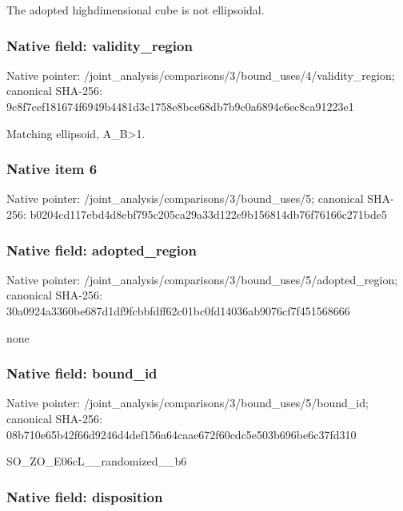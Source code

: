 \documentclass[10pt,a4paper]{article}
\begin{document}
The adopted highdimensional cube is not ellipsoidal.


\subsubsection{Native field: validity\_region}


Native pointer: /joint\_analysis/comparis\allowbreak{}ons/3/bound\_uses/4/valid\allowbreak{}ity\_region; canonical SHA-256: 9c8f7cef181674f6949b4481\allowbreak{}d3c1758e8bce68db7b9c0a68\allowbreak{}94c6ec8ca91223e1


Matching ellipsoid, A\_B>1.


\subsubsection{Native item 6}


Native pointer: /joint\_analysis/comparis\allowbreak{}ons/3/bound\_uses/5; canonical SHA-256: b0204cd117ebd4d8ebf795c2\allowbreak{}05ca29a33d122e9b156814db\allowbreak{}76f76166c271bde5



\subsubsection{Native field: adopted\_region}


Native pointer: /joint\_analysis/comparis\allowbreak{}ons/3/bound\_uses/5/adopt\allowbreak{}ed\_region; canonical SHA-256: 30a0924a3360be687d1df9fc\allowbreak{}bbfdff62c01bc0fd14036ab9\allowbreak{}076cf7f451568666


none


\subsubsection{Native field: bound\_id}


Native pointer: /joint\_analysis/comparis\allowbreak{}ons/3/bound\_uses/5/bound\allowbreak{}\_id; canonical SHA-256: 08b710e65b42f66d9246d4de\allowbreak{}f156a64caae672f60cdc5e50\allowbreak{}3b696be6c37fd310


SO\_ZO\_E06cL\_\_randomized\_\_b6


\subsubsection{Native field: disposition}
\end{document}
